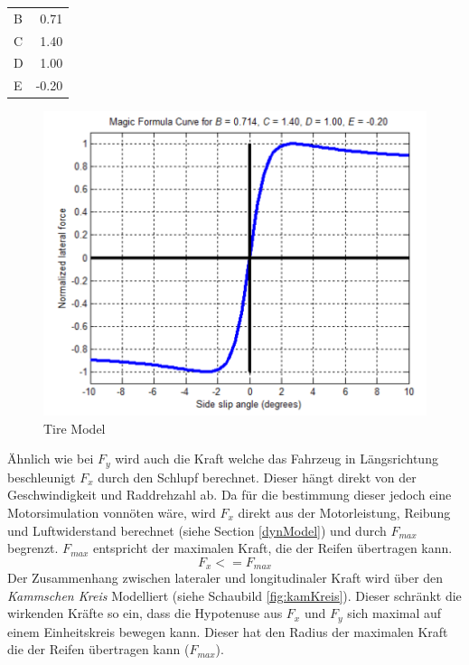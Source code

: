 \documentclass{like}
\begin{document}
\begin{tabular}[t]{lr}
 	B	&	0.71 \\
 	C	&	1.40 \\
 	D	&	1.00 \\
 	E	&  -0.20 \\
\end{tabular}
 
 
 \begin{figure}[ht!]
 	\includegraphics[width=350pt]{Abbildungen/pacejka.png}
 	\caption{Tire Model}
 	\label{fig:pacejka}
 \end{figure}
 
Ähnlich wie bei \(F_y\) wird auch die Kraft welche das Fahrzeug in Längsrichtung beschleunigt \(F_x\) durch den Schlupf berechnet. Dieser hängt direkt von der Geschwindigkeit und Raddrehzahl ab. 
Da für die bestimmung dieser jedoch eine Motorsimulation vonnöten wäre, wird \(F_x\) direkt aus der Motorleistung, Reibung und Luftwiderstand berechnet (siehe Section \ref{dynModel}) und durch \(F_{max}\) begrenzt. \(F_{max}\) entspricht der maximalen Kraft, die der Reifen übertragen kann.\\
\begin{equation}
 	F_x <= F_{max}
\end{equation}
Der Zusammenhang zwischen lateraler und longitudinaler Kraft wird über den \textit{Kammschen Kreis} Modelliert (siehe Schaubild \ref{fig:kamKreis}). Dieser schränkt die wirkenden Kräfte so ein, dass die Hypotenuse aus \(F_x\) und \(F_y\) sich maximal auf einem Einheitskreis bewegen kann. Dieser hat den Radius der maximalen Kraft die der Reifen übertragen kann (\(F_{max}\)).
\end{document}
